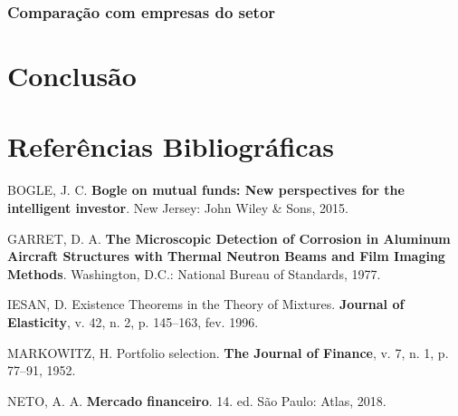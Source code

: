 \documentclass[grad,numbers]{coppe}
\begin{document}
  \hypertarget{comparauxe7uxe3o-com-empresas-do-setor}{%
  \subsection{Comparação com empresas do setor}\label{comparauxe7uxe3o-com-empresas-do-setor}}
  
  \hypertarget{conclusuxe3o}{%
  \chapter{Conclusão}\label{conclusuxe3o}}
  
  \backmatter
  
  \hypertarget{referuxeancias-bibliogruxe1ficas}{%
  \chapter*{Referências Bibliográficas}\label{referuxeancias-bibliogruxe1ficas}}
  
  
  \label{bib:begin}
  \noindent
  
  \setlength{\parindent}{-0.20in}
  \setlength{\leftskip}{0.20in}
  \setlength{\parskip}{8pt}
  
  \hypertarget{refs}{}
  \leavevmode\hypertarget{ref-bogle2015}{}%
  BOGLE, J. C. \textbf{Bogle on mutual funds: New perspectives for the intelligent investor}. New Jersey: John Wiley \& Sons, 2015.
  
  \leavevmode\hypertarget{ref-techreport-exampleIn}{}%
  GARRET, D. A. \textbf{The Microscopic Detection of Corrosion in Aluminum Aircraft Structures with Thermal Neutron Beams and Film Imaging Methods}. Washington, D.C.: National Bureau of Standards, 1977.
  
  \leavevmode\hypertarget{ref-article-example}{}%
  IESAN, D. Existence Theorems in the Theory of Mixtures. \textbf{Journal of Elasticity}, v. 42, n. 2, p. 145--163, fev. 1996.
  
  \leavevmode\hypertarget{ref-markowitz1952}{}%
  MARKOWITZ, H. Portfolio selection. \textbf{The Journal of Finance}, v. 7, n. 1, p. 77--91, 1952.
  
  \leavevmode\hypertarget{ref-assafneto2018}{}%
  NETO, A. A. \textbf{Mercado financeiro}. 14. ed. São Paulo: Atlas, 2018.

  \backmatter
  
  

\end{document}
